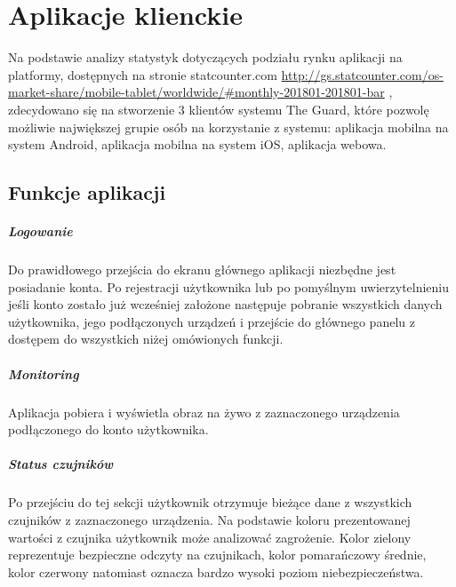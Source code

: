 \chapter{Aplikacje klienckie}

Na podstawie analizy statystyk dotyczących podziału rynku aplikacji na platformy, dostępnych na stronie statcounter.com \url{http://gs.statcounter.com/os-market-share/mobile-tablet/worldwide/#monthly-201801-201801-bar} , zdecydowano się na stworzenie 3 klientów systemu The Guard, które pozwolę możliwie największej grupie osób na korzystanie z systemu:
\newline
\newline
\textbullet \space aplikacja mobilna na system Android,\newline
\textbullet \space aplikacja mobilna na system iOS,\newline
\textbullet \space aplikacja webowa.

\section{Funkcje aplikacji}
\paragraph{Logowanie}
Do prawidłowego przejścia do ekranu głównego aplikacji niezbędne jest posiadanie konta. Po rejestracji użytkownika lub po pomyślnym uwierzytelnieniu jeśli konto zostało już wcześniej założone następuje pobranie wszystkich danych użytkownika, jego podłączonych urządzeń i przejście do głównego panelu z dostępem do wszystkich niżej omówionych funkcji. 

\paragraph{Monitoring}
Aplikacja pobiera i wyświetla obraz na żywo z zaznaczonego urządzenia podłączonego do konto użytkownika. 

\paragraph{Status czujników}
Po przejściu do tej sekcji użytkownik otrzymuje bieżące dane z wszystkich czujników z zaznaczonego urządzenia. Na podstawie koloru prezentowanej wartości z czujnika użytkownik może analizować zagrożenie. Kolor zielony reprezentuje bezpieczne odczyty na czujnikach, kolor pomarańczowy średnie, kolor czerwony natomiast oznacza bardzo wysoki poziom niebezpieczeństwa.

